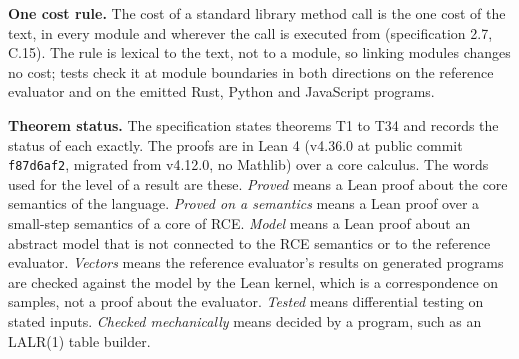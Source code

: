 \documentclass[10pt,letterpaper]{article}
\begin{document}
\textbf{One cost rule.} The cost of a standard library method call is
the one cost of the text, in every module and wherever the call is
executed from (specification 2.7, C.15). The rule is lexical to the
text, not to a module, so linking modules changes no cost; tests check
it at module boundaries in both directions on the reference evaluator
and on the emitted Rust, Python and JavaScript programs.

\textbf{Theorem status.} The specification states theorems T1 to T34 and
records the status of each exactly. The proofs are in Lean 4 (v4.36.0 at
public commit \texttt{f87d6af2}, migrated from v4.12.0, no Mathlib) over
a core calculus. The words used for the level of a
result are these. \emph{Proved} means a Lean proof about the core
semantics of the language. \emph{Proved on a semantics} means a Lean
proof over a small-step semantics of a core of RCE. \emph{Model} means a
Lean proof about an abstract model that is not connected to the RCE
semantics or to the reference evaluator. \emph{Vectors} means the
reference evaluator's results on generated programs are checked against
the model by the Lean kernel, which is a correspondence on samples, not
a proof about the evaluator. \emph{Tested} means differential testing on
stated inputs. \emph{Checked mechanically} means decided by a program,
such as an LALR(1) table builder.
\end{document}
